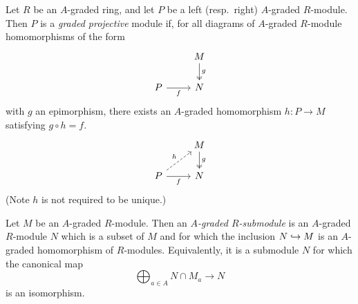 \documentclass[../main.tex]{subfiles}
\begin{document}
\begin{definition}\label{graded_projective_module}
	Let $R$ be an $A$-graded ring, and let $P$ be a left (resp.\ right) $A$-graded $R$-module. Then $P$ is a \emph{graded projective} module if, for all diagrams of $A$-graded $R$-module homomorphisms of the form 
	\[\begin{tikzcd}
		& M \\
		P & N
		\arrow["f"', from=2-1, to=2-2]
		\arrow["g", two heads, from=1-2, to=2-2]
	\end{tikzcd}\]
	with $g$ an epimorphism, there exists an $A$-graded homomorphism $h:P\to M$ satisfying $g\circ h=f$.
	\[\begin{tikzcd}
		& M \\
		P & N
		\arrow["f"', from=2-1, to=2-2]
		\arrow["g", two heads, from=1-2, to=2-2]
		\arrow["h", dashed, from=2-1, to=1-2]
	\end{tikzcd}\]
	(Note $h$ is not required to be unique.)
\end{definition}

\begin{definition}
	Let $M$ be an $A$-graded $R$-module. Then an \emph{$A$-graded $R$-submodule} is an $A$-graded $R$-module $N$ which is a subset of $M$ and for which the inclusion $N\hookrightarrow M$ is an $A$-graded homomorphism of $R$-modules. Equivalently, it is a submodule $N$ for which the canonical map
	\[\bigoplus_{a\in A} N\cap M_a\to N\]
	is an isomorphism.
\end{definition}
\end{document}
